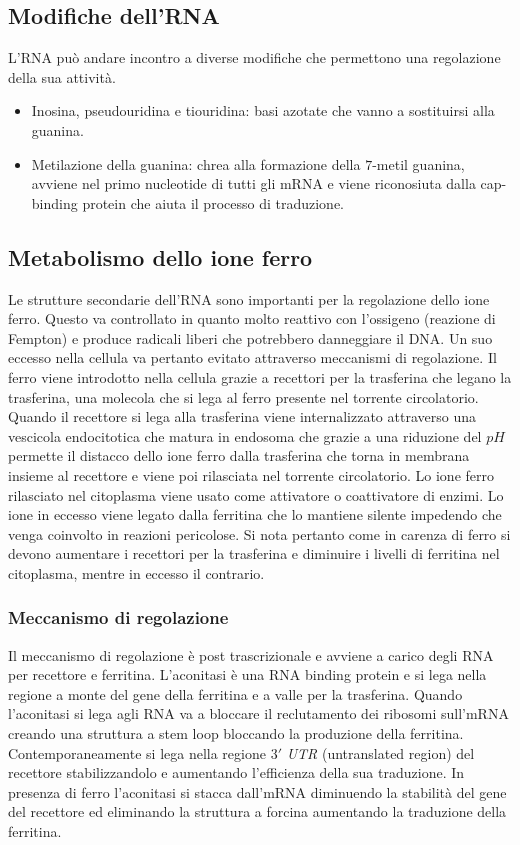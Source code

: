 \subsection{Modifiche dell'RNA}
L'RNA pu\`o andare incontro a diverse modifiche che permettono una regolazione della sua attivit\`a.
\begin{itemize}
	\item Inosina, pseudouridina e tiouridina: basi azotate che vanno a sostituirsi alla guanina.
	\item Metilazione della guanina: chrea alla formazione della $7$-metil guanina, avviene nel primo nucleotide di tutti gli mRNA e viene riconosiuta dalla cap-binding protein che
		aiuta il processo di traduzione.
\end{itemize}
\subsection{Metabolismo dello ione ferro}
Le strutture secondarie dell'RNA sono importanti per la regolazione dello ione ferro. Questo va controllato in quanto molto reattivo con l'ossigeno (reazione di Fempton) e produce 
radicali liberi che potrebbero danneggiare il DNA. Un suo eccesso nella cellula va pertanto evitato attraverso meccanismi di regolazione. Il ferro viene introdotto nella cellula 
grazie a recettori per la trasferina che legano la trasferina, una molecola che si lega al ferro presente nel torrente circolatorio. Quando il recettore si lega alla trasferina 
viene internalizzato attraverso una vescicola endocitotica che matura in endosoma che grazie a una riduzione del $pH$ permette il distacco dello ione ferro dalla trasferina che torna
in membrana insieme al recettore e viene poi rilasciata nel torrente circolatorio. Lo ione ferro rilasciato nel citoplasma viene usato come attivatore o coattivatore di enzimi. Lo
ione in eccesso viene legato dalla ferritina che lo mantiene silente impedendo che venga coinvolto in reazioni pericolose. Si nota pertanto come in carenza di ferro si devono aumentare
i recettori per la trasferina e diminuire i livelli di ferritina nel citoplasma, mentre in eccesso il contrario. 
\subsubsection{Meccanismo di regolazione}
Il meccanismo di regolazione \`e post trascrizionale e avviene a carico degli RNA per recettore e ferritina. L'aconitasi \`e una RNA binding protein e si lega nella regione a monte del
gene della ferritina e a valle per la trasferina. Quando l'aconitasi si lega agli RNA va a bloccare il reclutamento dei ribosomi sull'mRNA creando una struttura a stem loop bloccando la
produzione della ferritina. Contemporaneamente si lega nella regione $3'$ \emph{UTR} (untranslated region) del recettore stabilizzandolo e aumentando l'efficienza della sua traduzione. 
In presenza di ferro l'aconitasi si stacca dall'mRNA diminuendo la stabilit\`a del gene del recettore ed eliminando la struttura a forcina aumentando la traduzione della ferritina. 
